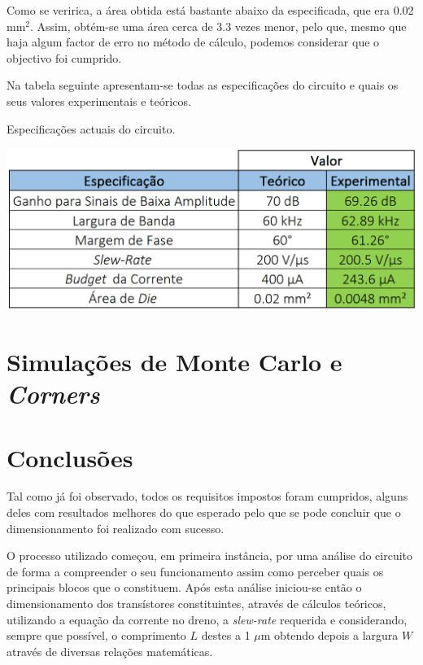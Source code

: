 \documentclass[11pt]{article}
\numberwithin{equation}{section}
\begin{document}
\vspace{-1mm}
Como se veririca, a área obtida está bastante abaixo da especificada, que era 0.02 $\text{mm}^2$. Assim, obtém-se uma área cerca de 3.3 vezes menor, pelo que, mesmo que haja algum factor de erro no método de cálculo, podemos considerar que o objectivo foi cumprido. 

Na tabela seguinte apresentam-se todas as especificações do circuito e quais os seus valores experimentais e teóricos.

\begin{table}[H]
	\centering
	\caption{Especificações actuais do circuito.}
	\vspace{-1.5mm}
	\includegraphics[keepaspectratio=true, scale=0.40]{teoricas/tabcarea}
\end{table}

\pagebreak

\section{Simulações de Monte Carlo e \textit{Corners}}


\pagebreak

\section{Conclusões}

Tal como já foi observado, todos os requisitos impostos foram cumpridos, alguns deles com resultados melhores do que esperado pelo que se pode concluir que o dimensionamento foi realizado com sucesso.

O processo utilizado começou, em primeira instância, por uma análise do circuito de forma a compreender o seu funcionamento assim como perceber quais os principais blocos que o constituem. Após esta análise iniciou-se então o dimensionamento dos transístores constituintes, através de cálculos teóricos, utilizando a equação da corrente no dreno, a \textit{slew-rate} requerida e considerando, sempre que possível, o comprimento $L$ destes a 1 $\mu$m obtendo depois a largura $W$ através de diversas relações matemáticas.
\end{document}
